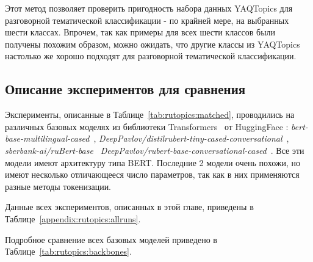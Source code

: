 Этот метод позволяет проверить пригодность набора данных {YAQTopics} для разговорной тематической классификации - по крайней мере, на выбранных шести классах. Впрочем, так как примеры для всех шести классов были получены похожим образом, можно ожидать, что другие классы из {YAQTopics} настолько же хорошо подходят для разговорной тематической классификации.

\subsection{Описание экспериментов для сравнения}
Эксперименты, описанные в Таблице~\ref{tab:rutopics:matched}, проводились на различных базовых моделях из библиотеки {Transformers}~\cite{huggingface_transformers} от HuggingFace : \textit{bert-base-multilingual-cased}~\cite{multilingual_bert}, \textit{DeepPavlov/distilrubert-tiny-cased-conversational}~\cite{distilrubert}, \textit{sberbank-ai/ruBert-base}~\cite{sbert_base}  \textit{DeepPavlov/rubert-base-conversational-cased}~\cite{rubert}. Все эти модели имеют архитектуру типа BERT. Последние 2 модели очень похожи, но имеют несколько отличающееся число параметров, так как в них применяются разные методы токенизации.

Данные всех экспериментов, описанных в этой главе, приведены в Таблице~\ref{appendix:rutopics:allruns}. 

Подробное сравнение всех базовых моделей приведено в Таблице~\ref{tab:rutopics:backbones}.

\begin{table*}
\centering
{}
\caption{Параметры различных базовых моделей, рассмотренных в этой главе}
\label{tab:rutopics:backbones}
\end{table*}

